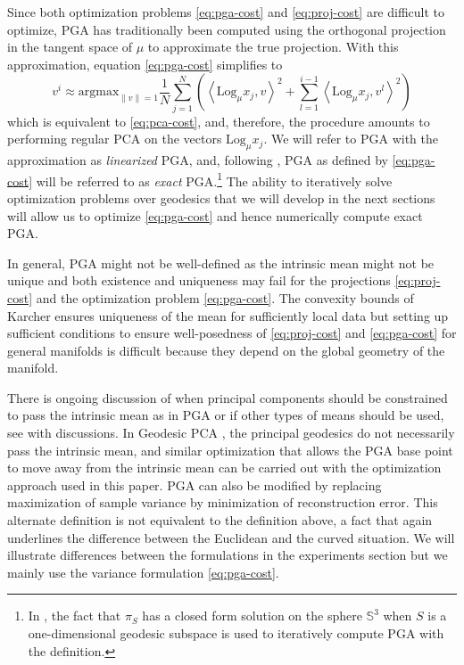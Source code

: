\documentclass[final]{svjour3}
\newcommand{\argmax}{\mathrm{argmax}}
\newcommand{\SSS}{\mathbb{S}}
\newcommand{\ip}[1]{\left<#1\right>}
\newcommand{\Log}{\mathrm{Log}}
\begin{document}
Since both optimization problems \eqref{eq:pga-cost} and
\eqref{eq:proj-cost} are difficult to optimize, PGA has traditionally
been computed using the orthogonal projection in the tangent space of $\mu$
to approximate the true projection. With this approximation,
equation \eqref{eq:pga-cost} simplifies to
\begin{equation*}
    v^i
    \approx
    \argmax_{\|v\|=1}
    \frac{1}{N}
    \sum_{j=1}^N
    \left(\ip{\Log_\mu x_j,v}^2+\sum_{l=1}^{i-1} \ip{\Log_\mu x_j,v^l}^2\right)
\end{equation*}
which is equivalent to \eqref{eq:pca-cost}, and, therefore,
the procedure amounts to performing regular PCA on the vectors $\Log_\mu x_j$.
We will refer to PGA with the approximation
as \emph{linearized} PGA, and, following \cite{said_exact_2007}, PGA as 
defined by \eqref{eq:pga-cost} will be referred to
as \emph{exact} PGA.\footnote{In \cite{said_exact_2007},
the fact that $\pi_S$ has a closed form
solution on the sphere $\SSS^3$ when $S$ is a one-dimensional geodesic subspace is used to 
iteratively compute
PGA with the \cite{fletcher_statistics_2003} definition.}
The ability to iteratively solve optimization problems over
geodesics that we will develop in the next sections will allow us to
optimize \eqref{eq:pga-cost} and hence numerically compute exact PGA.

In general, PGA might not be well-defined as the intrinsic mean might not be
unique and both existence and uniqueness may fail for the 
projections \eqref{eq:proj-cost} and the optimization problem \eqref{eq:pga-cost}. The convexity
bounds of Karcher \cite{karcher_riemannian_1977} ensures uniqueness of the mean
for sufficiently local data but setting up sufficient conditions to ensure
well-posedness of \eqref{eq:proj-cost} and \eqref{eq:pga-cost}
for general manifolds is difficult
because they depend on the global geometry of the manifold.

There is ongoing discussion of when principal components should be constrained to
pass the intrinsic mean as in PGA or if other types of means should be used, see 
\cite{huckemann_intrinsic_2010} with discussions. 
In Geodesic PCA \cite{huckemann_intrinsic_2010}, the principal geodesics do not necessarily pass the intrinsic
mean, and similar optimization that allows the PGA base point to move away from the
intrinsic mean can be carried
out with the optimization approach used in this paper.
PGA can also be modified by replacing maximization of sample variance by 
minimization of reconstruction error.
This alternate definition is not equivalent to the definition above, a fact that
again underlines the difference between the Euclidean and the curved
situation. We will illustrate differences between the formulations in the
experiments section but we mainly use the variance formulation \eqref{eq:pga-cost}.
\end{document}
